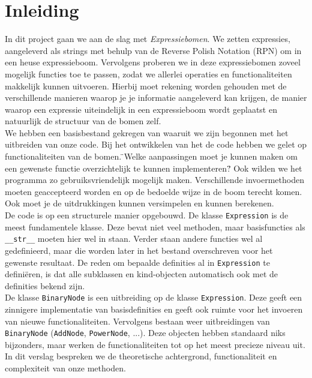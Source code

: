 \documentclass[12pt]{article}
\begin{document}
\section{Inleiding}
In dit project gaan we aan de slag met \textit{Expressiebomen}. We zetten expressies, aangeleverd als strings met behulp van de Reverse Polish Notation (RPN) om in een heuse expressieboom. Vervolgens proberen we in deze expressiebomen zoveel mogelijk functies toe te passen, zodat we allerlei operaties en functionaliteiten makkelijk kunnen uitvoeren. Hierbij moet rekening worden gehouden met de verschillende manieren waarop je je informatie aangeleverd kan krijgen, de manier waarop een expressie uiteindelijk in een expressieboom wordt geplaatst en natuurlijk de structuur van de bomen zelf. \\ \newline
We hebben een basisbestand gekregen van waaruit we zijn begonnen met het uitbreiden van onze code. Bij het ontwikkelen van het de code hebben we gelet op functionaliteiten van de bomen. \"{}Welke aanpassingen moet je kunnen maken om een gewenste functie overzichtelijk te kunnen implementeren?\"{} Ook wilden we het programma zo gebruiksvriendelijk mogelijk maken. Verschillende invoermethoden moeten geaccepteerd worden en op de bedoelde wijze in de boom terecht komen. Ook moet je de uitdrukkingen kunnen versimpelen en kunnen berekenen. \\ \newline
De code is op een structurele manier opgebouwd. De klasse \texttt{Expression} is de meest fundamentele klasse. Deze bevat niet veel methoden, maar basisfuncties als \texttt{\_\_str\_\_} moeten hier wel in staan. Verder staan andere functies wel al gedefinieerd, maar die worden later in het bestand overschreven voor het gewenste resultaat. De reden om bepaalde definities al in \texttt{Expression} te defini\"{e}ren, is dat alle subklassen en kind-objecten automatisch ook met de definities bekend zijn. \\
De klasse \texttt{BinaryNode} is een uitbreiding op de klasse \texttt{Expression}. Deze geeft een zinnigere implementatie van basisdefinities en geeft ook ruimte voor het invoeren van nieuwe functionaliteiten. Vervolgens bestaan weer uitbreidingen van \texttt{BinaryNode} (\texttt{AddNode}, \texttt{PowerNode}, ...). Deze objecten hebben standaard niks bijzonders, maar werken de functionaliteiten tot op het meest precieze niveau uit. \\ \newline 
In dit verslag bespreken we de theoretische achtergrond, functionaliteit en complexiteit van onze methoden.
\newpage
\end{document}
